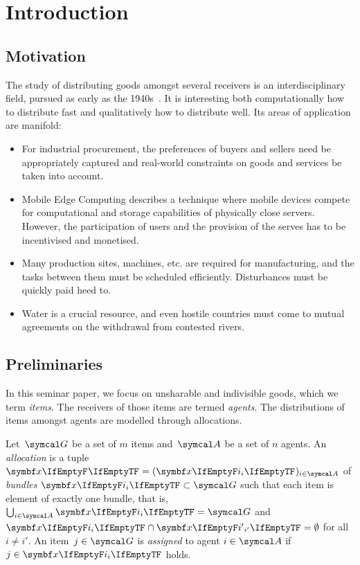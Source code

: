 \section{Introduction}
\label{sec:intro}

\subsection{Motivation}
\label{subsec:intro:motivation}

The study of distributing goods amongst several receivers is an interdisciplinary field, pursued as early as the 1940s~\cite{the_problem_of_fair_division}.
It is interesting both computationally \Dash how to distribute fast \Dash and qualitatively \Dash how to distribute well.
Its areas of application are manifold:
\begin{itemize}
	\item
	For industrial procurement, the preferences of buyers and sellers need be appropriately captured and real-world constraints on goods and services be taken into account.~\cite{survey}

	\item
	Mobile Edge Computing describes a technique where mobile devices compete for computational and storage capabilities of physically close servers.
	However, the participation of users and the provision of the serves has to be incentivised and monetised.~\cite{edge_computing_auction, edge_computing_report}

	\item
	Many production sites, machines, etc. are required for manufacturing, and the tasks between them must be scheduled efficiently.
	Disturbances must be quickly paid heed to.~\cite{survey}

	\item
	Water is a crucial resource, and even hostile countries must come to mutual agreements on the withdrawal from contested rivers.~\cite{water_management}
\end{itemize}

\subsection{Preliminaries}
\label{subsec:intro:prelim}

In this seminar paper, we focus on unsharable and indivisible goods, which we term \emph{items}.
The receivers of those items are termed \emph{agents}.
The distributions of items amongst agents are modelled through allocations.
\begin{definition}
	Let~\(\goods\) be a set of \(m\) items and~\(\agents\) be a set of \(n\) agents.
	An \emph{allocation} is a tuple \(\alloc[][] = (\alloc)_{i \in \agents}\) of \emph{bundles} \(\alloc \subset \goods\) such that each item is element of exactly one bundle, that is, \(\bigcup_{i \in \agents} \alloc = \goods\) and \(\alloc \cap \alloc[][i'] = \emptyset\) for all \(i \neq i'\).
	An item~\(j \in \goods\) is \emph{assigned} to agent \(i \in \agents\) if \(j \in \alloc\) holds.
\end{definition}

